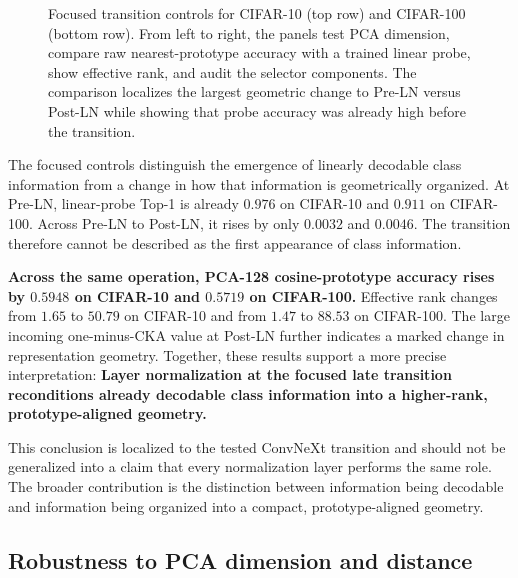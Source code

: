 \begin{figure}[!htbp]
    \centering
    \caption{Focused transition controls for CIFAR-10 (top row) and CIFAR-100
    (bottom row). From left to right, the panels test PCA dimension, compare
    raw nearest-prototype accuracy with a trained linear probe, show effective
    rank, and audit the selector components. The comparison localizes the
    largest geometric change to Pre-LN versus Post-LN while showing that probe
    accuracy was already high before the transition.}
    \label{fig:pca-transition-mechanism}
\end{figure}



The focused controls distinguish the emergence of linearly decodable class
information from a change in how that information is geometrically organized.
At Pre-LN, linear-probe Top-1 is already $0.976$ on CIFAR-10 and $0.911$ on
CIFAR-100. Across Pre-LN to Post-LN, it rises by only $0.0032$ and $0.0046$.
The transition therefore cannot be described as the first appearance of class
information.

\textbf{Across the same operation, PCA-128 cosine-prototype accuracy rises by
$0.5948$ on CIFAR-10 and $0.5719$ on CIFAR-100.} Effective rank changes from
$1.65$ to $50.79$ on CIFAR-10 and from $1.47$ to $88.53$ on CIFAR-100. The
large incoming one-minus-CKA value at Post-LN further indicates a marked change
in representation geometry. Together, these results support a more precise
interpretation: \textbf{Layer normalization at the focused late transition
reconditions already decodable class information into a higher-rank,
prototype-aligned geometry.}

This conclusion is localized to the tested ConvNeXt transition and should not
be generalized into a claim that every normalization layer performs the same
role. The broader contribution is the distinction between information being
decodable and information being organized into a compact, prototype-aligned
geometry.

\subsection{Robustness to PCA dimension and distance}




